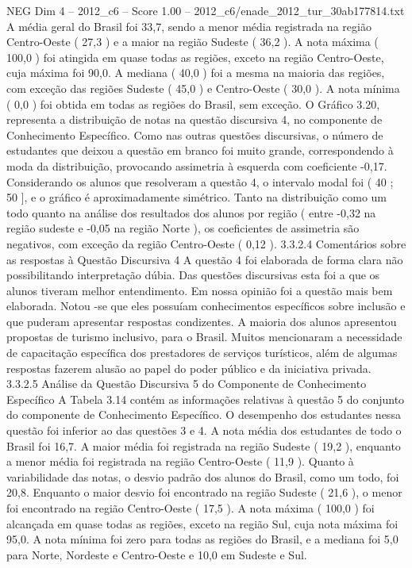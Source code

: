 \begin{textsample}{NEG Dim 4 – 2012\_c6 – Score 1.00 – 2012\_c6/enade\_2012\_tur\_30ab177814.txt}
A média geral do Brasil foi 33,7, sendo a menor média registrada na região Centro-Oeste ( 27,3 ) e a maior na região Sudeste ( 36,2 ).
A nota máxima ( 100,0 ) foi atingida em quase todas as regiões, exceto na região Centro-Oeste, cuja máxima foi 90,0.
A mediana ( 40,0 ) foi a mesma na maioria das regiões, com exceção das regiões Sudeste ( 45,0 ) e Centro-Oeste ( 30,0 ).
A nota mínima ( 0,0 ) foi obtida em todas as regiões do Brasil, sem exceção.
O Gráfico 3.20, representa a distribuição de notas na questão discursiva 4, no componente de Conhecimento Específico.
Como nas outras questões discursivas, o número de estudantes que deixou a questão em branco foi muito grande, correspondendo à moda da distribuição, provocando assimetria à esquerda com coeficiente -0,17.
Considerando os alunos que resolveram a questão 4, o intervalo modal foi ( 40 ; 50 ], e o gráfico é aproximadamente simétrico.
Tanto na distribuição como um todo quanto na análise dos resultados dos alunos por região ( entre -0,32 na região sudeste e -0,05 na região Norte ), os coeficientes de assimetria são negativos, com exceção da região Centro-Oeste ( 0,12 ). 3.3.2.4 Comentários sobre as respostas à Questão Discursiva 4 A questão 4 foi elaborada de forma clara não possibilitando interpretação dúbia.
Das questões discursivas esta foi a que os alunos tiveram melhor entendimento.
Em nossa opinião foi a questão mais bem elaborada.
Notou -se que eles possuíam conhecimentos específicos sobre inclusão e que puderam apresentar respostas condizentes.
A maioria dos alunos apresentou propostas de turismo inclusivo, para o Brasil.
Muitos mencionaram a necessidade de capacitação específica dos prestadores de serviços turísticos, além de algumas respostas fazerem alusão ao papel do poder público e da iniciativa privada. 3.3.2.5 Análise da Questão Discursiva 5 do Componente de Conhecimento Específico A Tabela 3.14 contém as informações relativas à questão 5 do conjunto do componente de Conhecimento Específico.
O desempenho dos estudantes nessa questão foi inferior ao das questões 3 e 4.
A nota média dos estudantes de todo o Brasil foi 16,7.
A maior média foi registrada na região Sudeste ( 19,2 ), enquanto a menor média foi registrada na região Centro-Oeste ( 11,9 ).
Quanto à variabilidade das notas, o desvio padrão dos alunos do Brasil, como um todo, foi 20,8.
Enquanto o maior desvio foi encontrado na região Sudeste ( 21,6 ), o menor foi encontrado na região Centro-Oeste ( 17,5 ).
A nota máxima ( 100,0 ) foi alcançada em quase todas as regiões, exceto na região Sul, cuja nota máxima foi 95,0.
A nota mínima foi zero para todas as regiões do Brasil, e a mediana foi 5,0 para Norte, Nordeste e Centro-Oeste e 10,0 em Sudeste e Sul.

\end{textsample}
